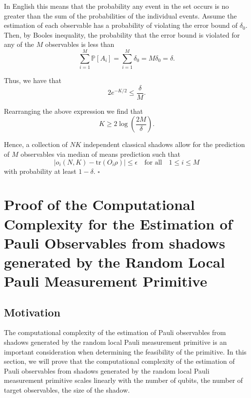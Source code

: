\documentclass[12pt]{article}
\begin{document}
    In English this means that the probability any event in the set occurs is no greater than the sum of the probabilities of the individual events. Assume the estimation of each observable has a probability of violating the error bound of $\delta_0$. Then, by Booles inequality, the probability that the error bound is violated for any of the $M$ observables is less than
    \begin{equation*}
        \sum_{i=1}^M \mathbb{P}[A_i] = \sum_{i=1}^M \delta_0 = M\delta_0 = \delta.
    \end{equation*}

    Thus, we have that
    \begin{equation*}
        2e^{-K/2} \leq \frac{\delta}{M}.
    \end{equation*}

    Rearranging the above expression we find that
    \begin{equation*}
        K \geq 2\log{\left(\frac{2M}{\delta}\right)}.
    \end{equation*}

    Hence, a collection of $NK$ independent classical shadows allow for the prediction of $M$ observables via median of means prediction such that
    \begin{equation*}
        |\hat{o}_i(N,K) - \text{tr}(O_i\rho)| \leq \epsilon \quad \text{for all} \quad 1 \leq i \leq M
    \end{equation*}
    with probability at least $1-\delta$.
    \hfill $\square$

    \section{Proof of the Computational Complexity for the Estimation of Pauli Observables from shadows generated by the Random Local Pauli Measurement Primitive}

    \subsection{Motivation}
    The computational complexity of the estimation of Pauli observables from shadows generated by the random local Pauli measurement primitive is an important consideration when determining the feasibility of the primitive. In this section, we will prove that the computational complexity of the estimation of Pauli observables from shadows generated by the random local Pauli measurement primitive scales linearly with the number of qubits, the number of target observables, the size of the shadow.
\end{document}
